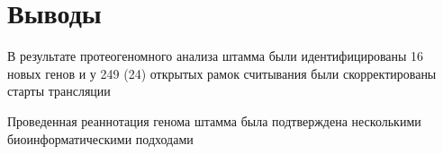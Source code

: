\section{Выводы}
В результате протеогеномного анализа штамма  были идентифицированы 16 новых генов и у 249 (24) открытых рамок считывания были скорректированы старты трансляции

Проведенная реаннотация генома штамма  была подтверждена несколькими биоинформатическими подходами

\newpage
